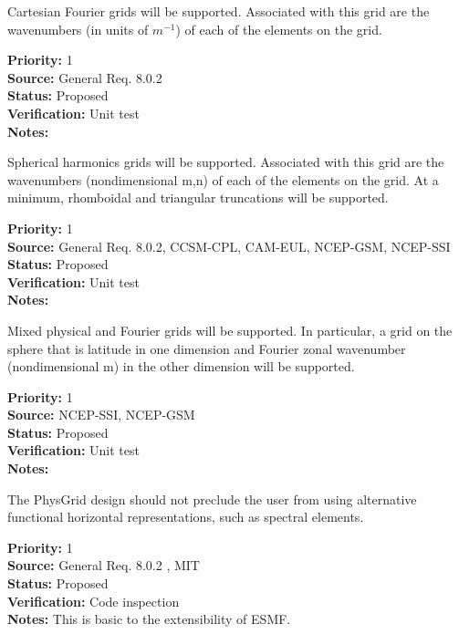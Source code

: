 Cartesian Fourier grids will be supported.  Associated with this grid are the
wavenumbers (in units of $m^{-1}$) of each of the elements on the grid.
\begin{reqlist}
{\bf Priority:} 1 \\
{\bf Source:} General Req. 8.0.2 \\
{\bf Status:} Proposed \\
{\bf Verification:} Unit test\\
{\bf Notes:}
\end{reqlist}

Spherical harmonics grids will be supported.  Associated with this grid are the
wavenumbers (nondimensional m,n) of each of the elements on the grid.  At a
minimum, rhomboidal and triangular truncations will be supported.
\begin{reqlist}
{\bf Priority:} 1 \\
{\bf Source:} General Req. 8.0.2, CCSM-CPL, CAM-EUL, NCEP-GSM, NCEP-SSI \\
{\bf Status:} Proposed \\
{\bf Verification:} Unit test\\
{\bf Notes:}
\end{reqlist}

Mixed physical and Fourier grids will be supported. In particular, a grid on the
sphere that is latitude in one dimension and Fourier zonal wavenumber
(nondimensional m) in the other dimension will be supported.
\begin{reqlist}
{\bf Priority:} 1 \\
{\bf Source:} NCEP-SSI, NCEP-GSM \\
{\bf Status:} Proposed \\
{\bf Verification:} Unit test\\
{\bf Notes:}
\end{reqlist}

The PhysGrid design should not preclude the user from using alternative
functional horizontal representations, such as spectral elements.
\begin{reqlist}
{\bf Priority:} 1 \\
{\bf Source:} General Req. 8.0.2 , MIT\\
{\bf Status:} Proposed \\
{\bf Verification:} Code inspection \\
{\bf Notes:} This is basic to the extensibility of ESMF.
\end{reqlist}

